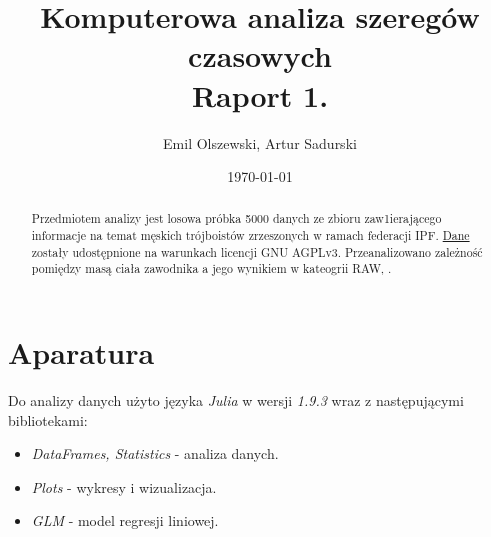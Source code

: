 \documentclass{article}
\author{Emil Olszewski, Artur Sadurski}
\date{\today}
\title{Komputerowa analiza szeregów czasowych \\ Raport 1.}
\begin{document}
\maketitle

\begin{abstract}
Przedmiotem analizy jest losowa próbka 5000 danych ze zbioru zaw1ierającego informacje na temat 
męskich trójboistów zrzeszonych w ramach federacji IPF. \href{https://gitlab.com/openpowerlifting/opl-data}{Dane} zostały udostępnione na warunkach licencji GNU AGPLv3. 
Przeanalizowano zależność pomiędzy masą ciała zawodnika a jego wynikiem w kateogrii RAW, . 
\end{abstract}

\section{Aparatura}
Do analizy danych użyto języka \textit{Julia} w wersji \textit{1.9.3} wraz z następującymi bibliotekami:
\begin{itemize}
\item \textit{DataFrames, Statistics} - analiza danych.
\item \textit{Plots} - wykresy i wizualizacja. 
\item \textit{GLM} - model regresji liniowej. 
\end{itemize}
\end{document}
